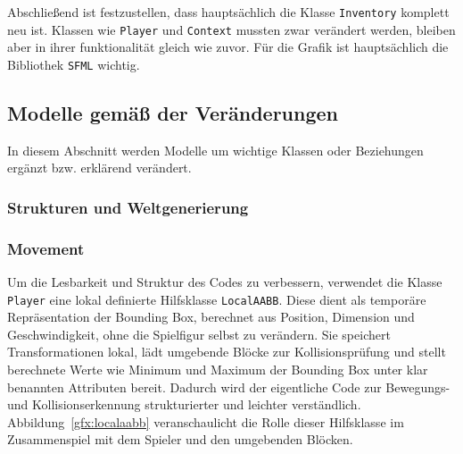 \documentclass{article}
\begin{document}
Abschließend ist festzustellen, dass hauptsächlich die Klasse \texttt{Inventory} komplett neu ist. Klassen wie \texttt{Player} und \texttt{Context} mussten zwar verändert werden, bleiben aber in ihrer funktionalität gleich wie zuvor. Für die Grafik ist hauptsächlich die Bibliothek \texttt{SFML} wichtig.

\subsection{Modelle gemä\ss{} der Veränderungen}

In diesem Abschnitt werden Modelle um wichtige Klassen oder Beziehungen ergänzt bzw. erklärend verändert.

\subsubsection{Strukturen und Weltgenerierung}


\FloatBarrier

\subsubsection{Movement}

Um die Lesbarkeit und Struktur des Codes zu verbessern, verwendet die Klasse \texttt{Player} eine lokal definierte Hilfsklasse \texttt{LocalAABB}.  Diese dient als temporäre Repräsentation der Bounding Box, berechnet aus Position, Dimension und Geschwindigkeit, ohne die Spielfigur selbst zu verändern. Sie speichert Transformationen lokal, lädt umgebende Blöcke zur Kollisionsprüfung und stellt berechnete Werte wie Minimum und Maximum der Bounding Box unter klar benannten Attributen bereit. Dadurch wird der eigentliche Code zur Bewegungs- und Kollisionserkennung strukturierter und leichter verständlich. Abbildung~\ref{gfx:localaabb} veranschaulicht die Rolle dieser Hilfsklasse im Zusammenspiel mit dem Spieler und den umgebenden Blöcken.
\end{document}
